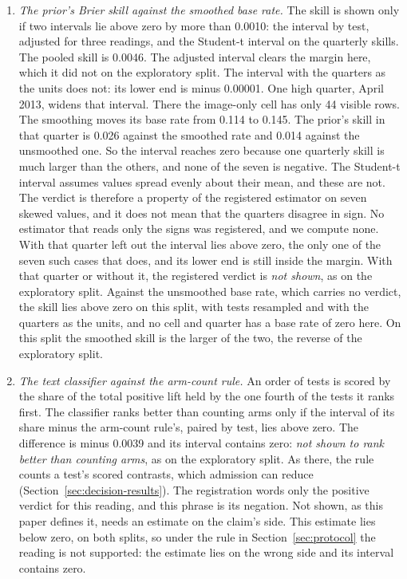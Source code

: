 \begin{enumerate}
\item \emph{The prior's Brier skill against the smoothed base rate.} The skill is shown only if two intervals lie above zero by more than 0.0010: the interval by test, adjusted for three readings, and the Student-t interval on the quarterly skills. The pooled skill is 0.0046. The adjusted interval clears the margin here, which it did not on the exploratory split. The interval with the quarters as the units does not: its lower end is minus 0.00001. One high quarter, April 2013, widens that interval. There the image-only cell has only 44 visible rows. The smoothing moves its base rate from 0.114 to 0.145. The prior's skill in that quarter is 0.026 against the smoothed rate and 0.014 against the unsmoothed one. So the interval reaches zero because one quarterly skill is much larger than the others, and none of the seven is negative. The Student-t interval assumes values spread evenly about their mean, and these are not. The verdict is therefore a property of the registered estimator on seven skewed values, and it does not mean that the quarters disagree in sign. No estimator that reads only the signs was registered, and we compute none. With that quarter left out the interval lies above zero, the only one of the seven such cases that does, and its lower end is still inside the margin. With that quarter or without it, the registered verdict is \emph{not shown}, as on the exploratory split. Against the unsmoothed base rate, which carries no verdict, the skill lies above zero on this split, with tests resampled and with the quarters as the units, and no cell and quarter has a base rate of zero here. On this split the smoothed skill is the larger of the two, the reverse of the exploratory split.
\item \emph{The text classifier against the arm-count rule.} An order of tests is scored by the share of the total positive lift held by the one fourth of the tests it ranks first. The classifier ranks better than counting arms only if the interval of its share minus the arm-count rule's, paired by test, lies above zero. The difference is minus 0.0039 and its interval contains zero: \emph{not shown to rank better than counting arms}, as on the exploratory split. As there, the rule counts a test's scored contrasts, which admission can reduce (Section~\ref{sec:decision-results}). The registration words only the positive verdict for this reading, and this phrase is its negation. Not shown, as this paper defines it, needs an estimate on the claim's side. This estimate lies below zero, on both splits, so under the rule in Section~\ref{sec:protocol} the reading is not supported: the estimate lies on the wrong side and its interval contains zero.
\end{enumerate}


